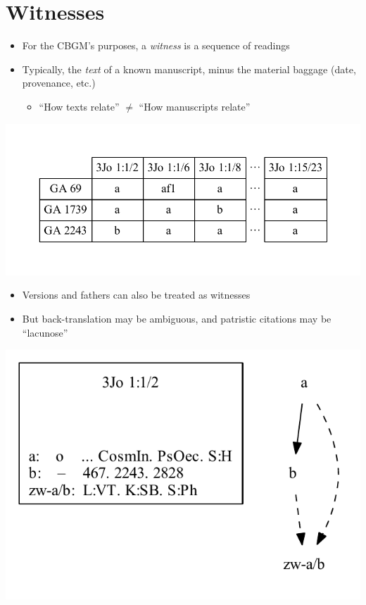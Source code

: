 \documentclass[10pt]{beamer}
\begin{document}
	\section*{Witnesses}
	\begin{frame}
		\begin{itemize}
			\item For the CBGM's purposes, a \emph{witness} is a sequence of readings
			\item Typically, the \emph{text} of a known manuscript, minus the material baggage (date, provenance, etc.)
			\begin{itemize}
				\item ``How texts relate'' $\neq$ ``How manuscripts relate''
			\end{itemize}
		\end{itemize}
		\begin{center}
			\includegraphics[scale=0.5]{../img/witnesses.pdf}
		\end{center}
	\end{frame}
	\begin{frame}
		\begin{itemize}
			\item Versions and fathers can also be treated as witnesses
			\item But back-translation may be ambiguous, and patristic citations may be ``lacunose''
		\end{itemize}
		\begin{center}
			\includegraphics[scale=0.5]{../img/B25K1V1U2-local-stemma-versions-fathers.pdf}
		\end{center}
	\end{frame}
\end{document}
